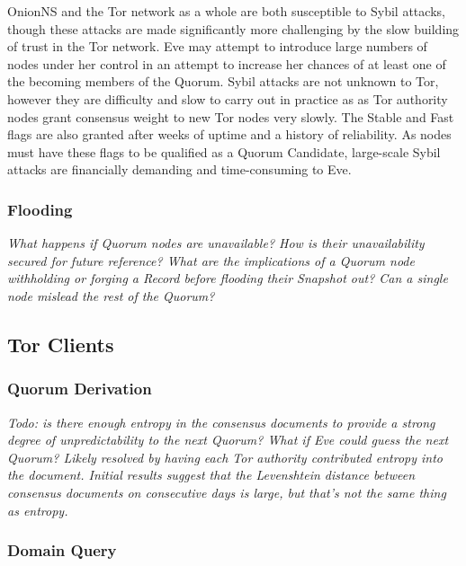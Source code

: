 OnionNS and the Tor network as a whole are both susceptible to Sybil attacks, though these attacks are made significantly more challenging by the slow building of trust in the Tor network. Eve may attempt to introduce large numbers of nodes under her control in an attempt to increase her chances of at least one of the becoming members of the Quorum. Sybil attacks are not unknown to Tor, however they are difficulty and slow to carry out in practice as as Tor authority nodes grant consensus weight to new Tor nodes very slowly. The Stable and Fast flags are also granted after weeks of uptime and a history of reliability. As nodes must have these flags to be qualified as a Quorum Candidate, large-scale Sybil attacks are financially demanding and time-consuming to Eve.

\subsubsection{Flooding}

\emph{What happens if Quorum nodes are unavailable? How is their unavailability secured for future reference? What are the implications of a Quorum node withholding or forging a Record before flooding their Snapshot out? Can a single node mislead the rest of the Quorum?}


\subsection{Tor Clients}

\subsubsection{Quorum Derivation}

\emph{Todo: is there enough entropy in the consensus documents to provide a strong degree of unpredictability to the next Quorum? What if Eve could guess the next Quorum? Likely resolved by having each Tor authority contributed entropy into the document. Initial results suggest that the Levenshtein distance between consensus documents on consecutive days is large, but that's not the same thing as entropy.}

\subsubsection{Domain Query}

